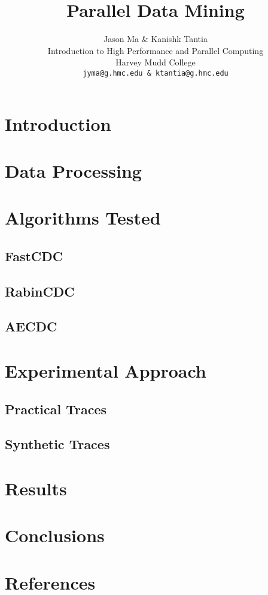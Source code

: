 \documentclass{article}
\title{Parallel Data Mining}
\author{
	Jason Ma \& Kanishk Tantia\\
	Introduction to High Performance and Parallel Computing \\
	Harvey Mudd College \\
	\texttt{jyma@g.hmc.edu \& ktantia@g.hmc.edu}   
	}
\begin{document}
	\maketitle
	\begin{abstract}

	\end{abstract}
	
	\section{Introduction}

	\section{Data Processing}

	
	\section{Algorithms Tested}

	\subsection{FastCDC}
	
	\subsection{RabinCDC}
	
	\subsection{AECDC}	
	
	\section{Experimental Approach}
	\subsection{Practical Traces}
	
	\subsection{Synthetic Traces}
	
	\section{Results}

	\section{Conclusions}

	\section{References}

	
\end{document}

